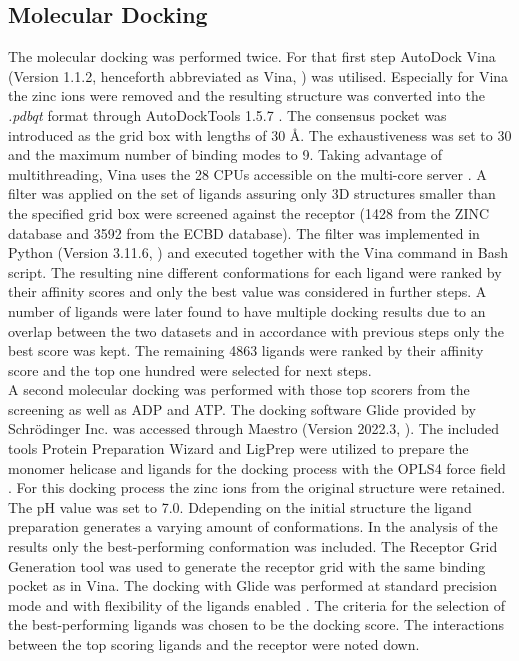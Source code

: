\documentclass[11pt, letterpaper, titlepage]{article}
\renewcommand{\cite}{\parencite}
\begin{document}
\subsection{Molecular Docking}
The molecular docking was performed twice. 
For that first step AutoDock Vina (Version 1.1.2, henceforth abbreviated as Vina, \textcite{Trott.2010}) was utilised. 
Especially for Vina the zinc ions were removed and the resulting structure was converted into the \textit{.pdbqt} format through AutoDockTools 1.5.7 \cite{Goodsell2021}. The consensus pocket was introduced as the grid box with lengths of 30 \AA. The exhaustiveness was set to 30 and the maximum number of binding modes to 9. Taking advantage of multithreading, \ac{Vina} uses the 28 CPUs accessible on the multi-core server \cite{Che2023}. A filter was applied on the set of ligands assuring only 3D structures smaller than the specified grid box were screened against the receptor (1428 from the ZINC database and 3592 from the ECBD database). The filter was implemented in Python (Version 3.11.6, \textcite{Python}) and executed together with the Vina command in Bash script. The resulting nine different conformations for each ligand were ranked by their affinity scores and only the best value was considered in further steps. A number of ligands were later found to have multiple docking results due to an overlap between the two datasets and in accordance with previous steps only the best score was kept. The remaining 4863 ligands were ranked by their affinity score and the top one hundred were selected for next steps. \\
A second molecular docking was performed with those top scorers from the screening as well as \ac{ADP} and \ac{ATP}. The docking software Glide provided by Schrödinger Inc. \cite{Friesner2004} was accessed through Maestro (Version 2022.3, \textcite{Maestro2022}). The included tools Protein Preparation Wizard and LigPrep \cite{Madhavi2013} were utilized to prepare the monomer helicase and ligands for the docking process with the OPLS4 force field \cite{Lu2021}. For this docking process the zinc ions from the original structure were retained. The pH value was set to 7.0. Ddepending on the initial structure the ligand preparation generates a varying amount of conformations. In the analysis of the results only the best-performing conformation was included. The Receptor Grid Generation tool was used to generate the receptor grid with the same binding pocket as in Vina. The docking with Glide was performed at standard precision mode and with flexibility of the ligands enabled \cite{Halgren.2004}. The criteria for the selection of the best-performing ligands was chosen to be the docking score. The interactions between the top scoring ligands and the receptor were noted down. 
\end{document}
